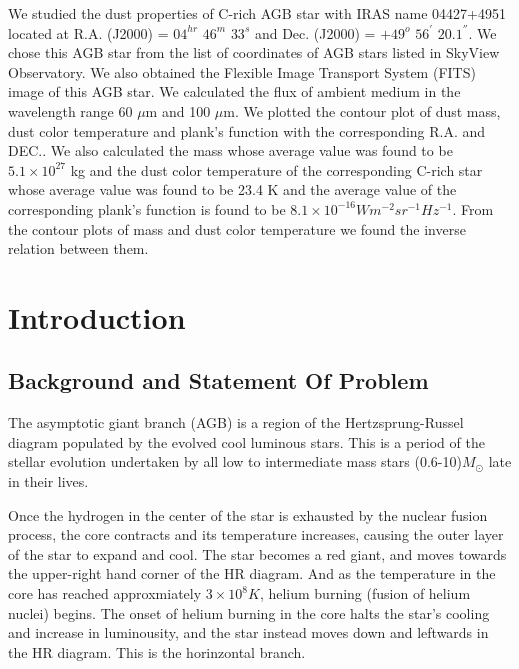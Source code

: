 \documentclass[12pt,a4paper]{report}
\begin{document}
We studied the dust properties of C-rich AGB star with IRAS name 04427+4951 located at R.A. (J2000) = $04^{hr}$ $46^{m}$ $33^{s}$ and Dec. (J2000) = $+49^{o}$ $56^{'}$ $20.1^{''}$. We chose this AGB star from the list of coordinates of AGB stars listed in SkyView Observatory. We also obtained the Flexible Image Transport System (FITS) image of this AGB star. We calculated the flux of ambient medium in the wavelength range 60 $\mu$m and 100 $\mu$m. We plotted the contour plot of dust mass, dust color temperature and plank's function with the corresponding R.A. and DEC.. We also calculated the mass whose average value was found to be $5.1\times10^{27}$ kg and the dust color temperature of the corresponding C-rich star whose average value was found to be 23.4 K and the average value of the  corresponding plank's function is found to be $8.1\times10^{-16}Wm^{-2}sr^{-1}Hz^{-1}$. From the contour plots of mass and dust color temperature we found the inverse relation between them.
\tableofcontents
\pagebreak
{}
\chapter{Introduction}
\section{Background and Statement Of Problem}

The asymptotic giant branch (AGB) is a region of the Hertzsprung-Russel diagram populated by the evolved cool luminous stars. This is a period of the stellar evolution undertaken by all low to intermediate mass stars (0.6-10)$M_{\odot}$ late in their lives.

Once the hydrogen in the center of the star is exhausted by the nuclear fusion process, the core contracts and its temperature increases, causing the outer layer of the star to expand and cool. The star becomes a red giant, and moves towards the upper-right hand corner of the HR diagram. And as the temperature in the core has reached approxmiately $3\times 10^8K$, helium burning (fusion of helium nuclei) begins. The onset of helium burning in the core halts the star's cooling and increase in luminousity, and the star instead moves down and leftwards in the HR diagram. This is the horinzontal branch. 
\end{document}
